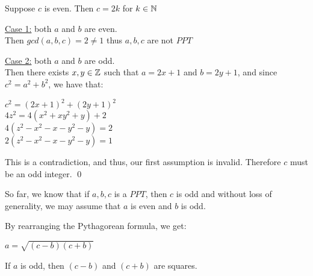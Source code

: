 \documentclass[../main.tex]{subfiles}
\begin{document}
\begin{pf}
Suppose $c$ is even.
Then $c=2k$ for $k \in \mathbb{N}$


\underline{Case 1:} both $a$ and $b$ are even. \\
Then $gcd(a, b, c) = 2 \neq 1$ thus $a, b, c$ are not $PPT$

\underline{Case 2:} both $a$ and $b$ are odd. \\
Then there exists $x, y \in \mathbb{Z}$ such that $a = 2x + 1$ and $b = 2y + 1$, and since $c^2 = a^2 + b^2$, we have that:

\begin{center}
    $c^2 = (2x + 1)^2 + (2y + 1)^2$ \\
    $4z^2 = 4(x^2 + x y^2 + y) + 2$ \\
    $4(z^2 - x^2 - x - y^2 - y) = 2$ \\
    $2(z^2 - x^2 - x - y^2 - y) = 1$
\end{center}

This is a contradiction, and thus, our first assumption is invalid. Therefore $c$ must be an odd integer. \qed
\end{pf}

So far, we know that if $a, b, c$ is a $PPT$, then $c$ is odd and without loss of generality, we may assume that $a$ is even and $b$ is odd.

By rearranging the Pythagorean formula, we get:

\centerline{$a = \sqrt{(c-b)(c+b)}$}

\begin{prop}
    If $a$ is odd, then $(c-b)$ and $(c+b)$ are squares.
\end{prop}
\end{document}
